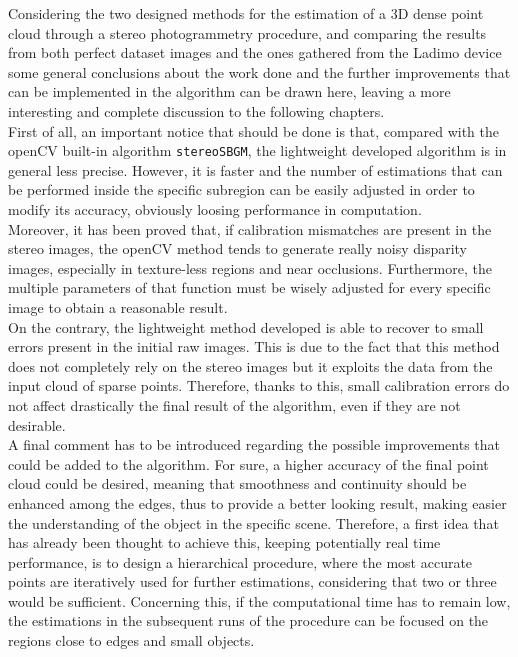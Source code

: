 Considering the two designed methods for the estimation of a 3D dense point cloud through a stereo photogrammetry procedure, and comparing the results from both perfect dataset images and the ones gathered from the Ladimo device some general conclusions about the work done and the further improvements that can be implemented in the algorithm can be drawn here, leaving a more interesting and complete discussion to the following chapters.\\
First of all, an important notice that should be done is that, compared with the openCV built-in algorithm \texttt{stereoSBGM}, the lightweight developed algorithm is in general less precise.
However, it is faster and the number of estimations that can be performed inside the specific subregion can be easily adjusted in order to modify its accuracy, obviously loosing performance in computation.\\
Moreover, it has been proved that, if calibration mismatches are present in the stereo images, the openCV method tends to generate really noisy disparity images, especially in texture-less regions and near occlusions.
Furthermore, the multiple parameters of that function must be wisely adjusted for every specific image to obtain a reasonable result.\\
On the contrary, the lightweight method developed is able to recover to small errors present in the initial raw images. 
This is due to the fact that this method does not completely rely on the stereo images but it exploits the data from the input cloud of sparse points.
Therefore, thanks to this, small calibration errors do not affect drastically the final result of the algorithm, even if they are not desirable. \\
A final comment has to be introduced regarding the possible improvements that could be added to the algorithm.
For sure, a higher accuracy of the final point cloud could be desired, meaning that smoothness and continuity should be enhanced among the edges, thus to provide a better looking result, making easier the understanding of the object in the specific scene.
Therefore, a first idea that has already been thought to achieve this, keeping potentially real time performance, is to design a hierarchical procedure, where the most accurate points are iteratively used for further estimations, considering that two or three would be sufficient.
Concerning this, if the computational time has to remain low, the estimations in the subsequent runs of the procedure can be focused on the regions close to edges and small objects.



